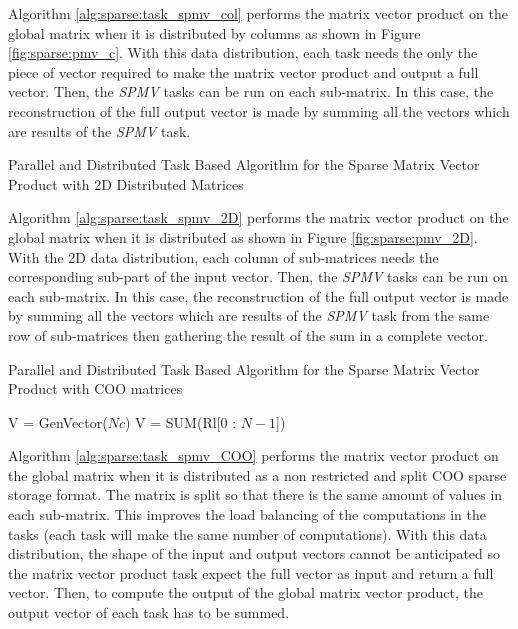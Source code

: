 Algorithm \ref{alg:sparse:task_spmv_col} performs the matrix vector product on the global matrix when it is distributed by columns as shown in Figure \ref{fig:sparse:pmv_c}.
With this data distribution, each task needs the only the piece of vector required to make the matrix vector product and output a full vector.
Then, the \textit{SPMV} tasks can be run on each sub-matrix.
In this case, the reconstruction of the full output vector is made by summing all the vectors which are results of the \textit{SPMV} task.


\begin{algorithm}[h]
	\DontPrintSemicolon
	\caption{Parallel and Distributed Task Based Algorithm for the Sparse  Matrix Vector Product with 2D Distributed Matrices \label{alg:sparse:task_spmv_2D}}
	\;
	\;
\end{algorithm}

Algorithm \ref{alg:sparse:task_spmv_2D} performs the matrix vector product on the global matrix when it is distributed as shown in Figure \ref{fig:sparse:pmv_2D}.
With the 2D data distribution, each column of sub-matrices needs the corresponding sub-part of the input vector.
Then, the \textit{SPMV} tasks can be run on each sub-matrix.
In this case, the reconstruction of the full output vector is made by summing all the vectors which are results of the \textit{SPMV} task from the same row of sub-matrices then gathering the result of the sum in a complete vector.

\begin{algorithm}[h]
	\DontPrintSemicolon
	\caption{Parallel and Distributed Task Based Algorithm for the Sparse  Matrix Vector Product with COO matrices \label{alg:sparse:task_spmv_COO}}
	V = GenVector($Nc$)\;
	\;
	\;
	V = SUM(Rl[0 : $N - 1$])\;
\end{algorithm}

Algorithm \ref{alg:sparse:task_spmv_COO} performs the matrix vector product on the global matrix when it is distributed as a non restricted and split COO sparse storage format.
The matrix is split so that there is the same amount of values in each sub-matrix.
This improves the load balancing of the computations in the tasks (each task will make the same number of computations).
With this data distribution, the shape of the input and output vectors cannot be anticipated so the matrix vector product task expect the full vector as input and return a full vector.
Then, to compute the output of the global matrix vector product, the output vector of each task has to be summed.

